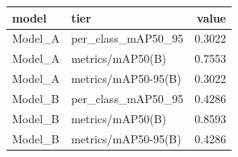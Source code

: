 \begin{tabular}{llr}
\toprule
model & tier & value \\
\midrule
Model_A & per_class_mAP50_95 & 0.3022 \\
Model_A & metrics/mAP50(B) & 0.7553 \\
Model_A & metrics/mAP50-95(B) & 0.3022 \\
Model_B & per_class_mAP50_95 & 0.4286 \\
Model_B & metrics/mAP50(B) & 0.8593 \\
Model_B & metrics/mAP50-95(B) & 0.4286 \\
\bottomrule
\end{tabular}
